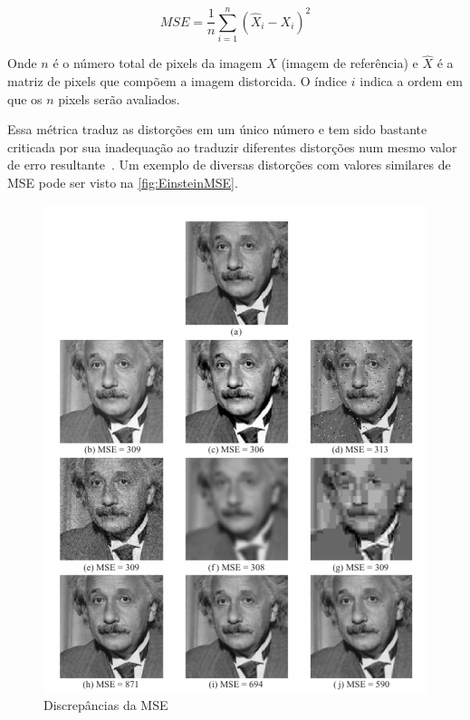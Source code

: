\begin{equation}
	MSE = \frac{1}{n}\sum^{n}_{i=1}(\hat{X}_i - X_i)^2
\end{equation}

Onde $n$ é o número total de pixels da imagem $X$ (imagem de referência) e  $\hat{X}$ é a matriz de pixels que compõem a imagem distorcida. O índice $i$ indica a ordem em que os $n$ pixels serão avaliados.

Essa métrica traduz as distorções em um único número e tem sido bastante criticada por sua inadequação ao traduzir diferentes distorções num mesmo valor de erro resultante~\cite{leaveItBovik}. Um exemplo de diversas distorções com valores similares de MSE pode ser visto na \autoref{fig:EinsteinMSE}.

\begin{figure}[htb]
	\centering
	\begin{minipage}{.8\textwidth}
		\caption{Discrepâncias da MSE}\label{fig:EinsteinMSE}
		\centerline{\includegraphics[width=\textwidth]{../img/EinsteinMSE.pdf}}
	\end{minipage}
\end{figure}

